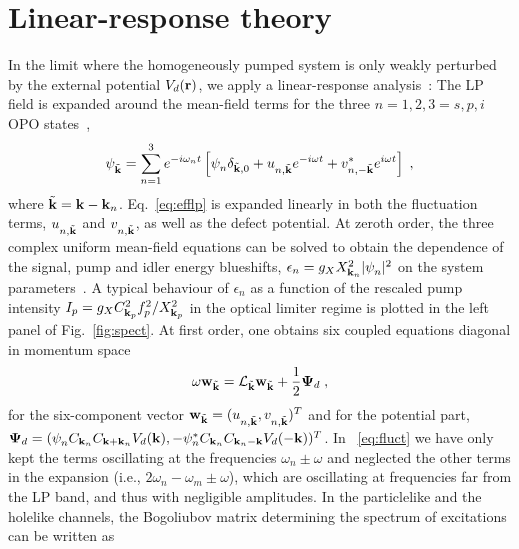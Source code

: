 \section{Linear-response theory}
\label{sec:line-resp-theory}
In the limit where the homogeneously pumped system is only weakly
perturbed by the external potential $V_d(\mathbf{r})$, we apply a
linear-response analysis~\cite{Astrakharchik_2004}: The LP field is
expanded around the mean-field terms for the three $n=1,2,3=s,p,i$ OPO
states~\cite{Whittaker_2005},
%
\begin{equation}
  \psi_{\tilde{\mathbf{k}}}^{} = \sum_{n=1}^3 e^{-i \omega_n t}
  \left[\psi_{n}^{} \delta_{\tilde{\mathbf{k}},0} +
    u_{n,\tilde{\mathbf{k}}}^{} e^{-i\omega t} +
    v^*_{n,-\tilde{\mathbf{k}}} e^{i\omega t} \right]\; ,
\label{eq:expan}
\end{equation}
%
where $\tilde{\mathbf{k}} = \mathbf{k} - \mathbf{k}_n$. Eq.~\eqref{eq:efflp}
is expanded linearly in both the fluctuation terms,
$u_{n,\tilde{\mathbf{k}}}^{}$ and $v_{n,\tilde{\mathbf{k}}}^{}$, as well
as the defect potential.  At zeroth order, the three complex uniform
mean-field equations can be solved to obtain the dependence of the
signal, pump and idler energy blueshifts, $\epsilon_n = g_X
X^2_{\mathbf{k}_n} |\psi_{n}^{}|^2$ on the system
parameters~\cite{Wouters_2007_b}. A typical behaviour of
$\epsilon_n$ as a function of the rescaled pump intensity $I_p = g_X
C_{\mathbf{k}_p}^2 f_p^2/X_{\mathbf{k}_p}^2$ in the optical limiter regime
is plotted in the left panel of Fig.~\ref{fig:spect}.
%
At first order, one obtains six coupled equations diagonal in momentum
space~\cite{Wouters_2007}
%
\begin{equation}
  \omega \mathbf{w}_{\tilde{\mathbf{k}}} = \mathcal{L}_{\tilde{\mathbf{k}}}
  \mathbf{w}_{\tilde{\mathbf{k}}} + \frac{1}{2} \bm{\Psi}_d\; ,
\label{eq:fluct}
\end{equation}
%
for the six-component vector $\mathbf{w}_{\tilde{\mathbf{k}}} =
(u_{n,\tilde{\mathbf{k}}}^{} , v_{n,\tilde{\mathbf{k}}}^{})^{T}$ and for
the potential part, $\bm{\Psi}_d = (\psi_n^{} C_{\mathbf{k}_n}
C_{\mathbf{k} + \mathbf{k}_n} V_d(\mathbf{k}),-\psi_n^* C_{\mathbf{k}_n}
C_{\mathbf{k}_n - \mathbf{k}} V_d(-\mathbf{k}))^{T}$. In ~\eqref{eq:fluct}
we have only kept the terms oscillating at the frequencies $\omega_n
\pm \omega$ and neglected the other terms in the expansion (i.e.,
$2\omega_n - \omega_m \pm \omega$), which are oscillating at
frequencies far from the LP band, and thus with negligible amplitudes.
%
In the particlelike and the holelike channels, the Bogoliubov matrix
determining the spectrum of excitations can be written
as~\cite{Wouters_2007}
%

